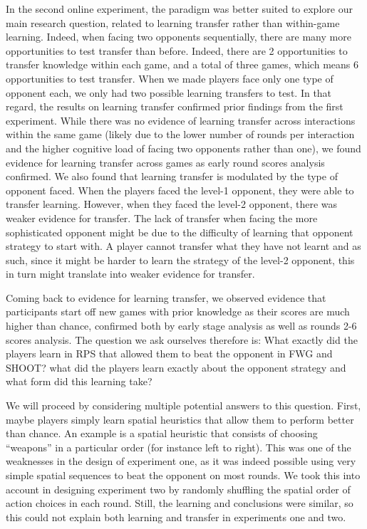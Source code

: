 \documentclass[man,floatsintext]{apa6}
\begin{document}
In the second online experiment, the paradigm was better suited to explore our main research question, related to learning transfer rather than within-game learning. Indeed, when facing two opponents sequentially, there are many more opportunities to test transfer than before. Indeed, there are 2 opportunities to transfer knowledge within each game, and a total of three games, which means 6 opportunities to test transfer. When we made players face only one type of opponent each, we only had two possible learning transfers to test. In that regard, the results on learning transfer confirmed prior findings from the first experiment. While there was no evidence of learning transfer across interactions within the same game (likely due to the lower number of rounds per interaction and the higher cognitive load of facing two opponents rather than one), we found evidence for learning transfer across games as early round scores analysis confirmed. We also found that learning transfer is modulated by the type of opponent faced. When the players faced the level-1 opponent, they were able to transfer learning. However, when they faced the level-2 opponent, there was weaker evidence for transfer. The lack of transfer when facing the more sophisticated opponent might be due to the difficulty of learning that opponent strategy to start with. A player cannot transfer what they have not learnt and as such, since it might be harder to learn the strategy of the level-2 opponent, this in turn might translate into weaker evidence for transfer.

Coming back to evidence for learning transfer, we observed evidence that participants start off new games with prior knowledge as their scores are much higher than chance, confirmed both by early stage analysis as well as rounds 2-6 scores analysis. The question we ask ourselves therefore is: What exactly did the players learn in RPS that allowed them to beat the opponent in FWG and SHOOT? what did the players learn exactly about the opponent strategy and what form did this learning take?

We will proceed by considering multiple potential answers to this question. First, maybe players simply learn spatial heuristics that allow them to perform better than chance. An example is a spatial heuristic that consists of choosing ``weapons'' in a particular order (for instance left to right). This was one of the weaknesses in the design of experiment one, as it was indeed possible using very simple spatial sequences to beat the opponent on most rounds. We took this into account in designing experiment two by randomly shuffling the spatial order of action choices in each round. Still, the learning and conclusions were similar, so this could not explain both learning and transfer in experiments one and two.
\end{document}
